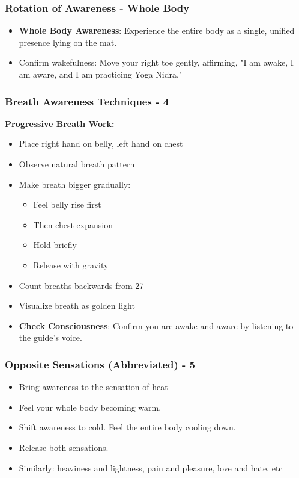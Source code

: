 \begin{frame}[fragile]\frametitle{Rotation of Awareness - Whole Body}
    \begin{itemize}
        \item \textbf{Whole Body Awareness}: Experience the entire body as a single, unified presence lying on the mat.
        \item Confirm wakefulness: Move your right toe gently, affirming, "I am awake, I am aware, and I am practicing Yoga Nidra."
    \end{itemize}
\end{frame}


\begin{frame}[fragile]\frametitle{Breath Awareness Techniques - 4}
    \textbf{Progressive Breath Work:}
    \begin{itemize}
        \item Place right hand on belly, left hand on chest
        \item Observe natural breath pattern
        \item Make breath bigger gradually:
        \begin{itemize}
            \item Feel belly rise first
            \item Then chest expansion
            \item Hold briefly
            \item Release with gravity
        \end{itemize}
        \item Count breaths backwards from 27
        \item Visualize breath as golden light
		\item \textbf{Check Consciousness}: Confirm you are awake and aware by listening to the guide’s voice.
    \end{itemize}
\end{frame}

\begin{frame}[fragile]\frametitle{Opposite Sensations (Abbreviated) - 5}
    \begin{itemize}
        \item Bring awareness to the sensation of heat
        \item Feel your whole body becoming warm.
        \item Shift awareness to cold. Feel the entire body cooling down.
        \item Release both sensations.
		\item Similarly: heaviness and lightness, pain and pleasure, love and hate, etc
    \end{itemize}
\end{frame}

